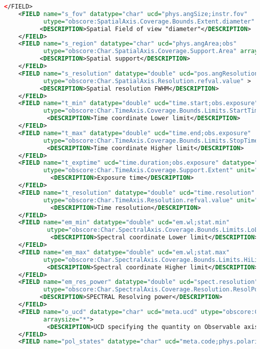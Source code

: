 \documentclass[11pt,a4paper]{ivoa}
\begin{document}
\begin{lstlisting}[basicstyle=\scriptsize,language=XML]
    </FIELD>
    <FIELD name="s_fov" datatype="char" ucd="phys.angSize;instr.fov"
           utype="obscore:SpatialAxis.Coverage.Bounds.Extent.diameter" unit="deg" >
          <DESCRIPTION>Spatial Field of view "diameter"</DESCRIPTION>
    </FIELD>
    <FIELD name="s_region" datatype="char" ucd="phys.angArea;obs"
           utype="obscore:Char.SpatialAxis.Coverage.Support.Area" arraysize="*" unit="deg" >
          <DESCRIPTION>Spatial support</DESCRIPTION>
    </FIELD>
    <FIELD name="s_resolution" datatype="double" ucd="pos.angResolution"
           utype="obscore:Char.SpatialAxis.Resolution.refval.value" >
          <DESCRIPTION>Spatial resolution FWHM</DESCRIPTION>
    </FIELD>
    <FIELD name="t_min" datatype="double" ucd="time.start;obs.exposure"
           utype="obscore:Char.TimeAxis.Coverage.Bounds.Limits.StartTime" unit="s" >
            <DESCRIPTION>Time coordinate Lower limit</DESCRIPTION>
    </FIELD>
    <FIELD name="t_max" datatype="double" ucd="time.end;obs.exposure"
           utype="obscore:Char.TimeAxis.Coverage.Bounds.Limits.StopTime" unit="s">
            <DESCRIPTION>Time coordinate Higher limit</DESCRIPTION>
    </FIELD>
    <FIELD name="t_exptime" ucd="time.duration;obs.exposure" datatype="double"
           utype="obscore:Char.TimeAxis.Coverage.Support.Extent" unit="s" >
             <DESCRIPTION>Exposure time</DESCRIPTION>
    </FIELD>
    <FIELD name="t_resolution" datatype="double" ucd="time.resolution"
           utype="obscore:Char.TimeAxis.Resolution.refval.value" unit="s" >
             <DESCRIPTION>Time resolution</DESCRIPTION>
    </FIELD>
    <FIELD name="em_min" datatype="double" ucd="em.wl;stat.min"
            utype="obscore:Char.SpectralAxis.Coverage.Bounds.Limits.LoLimit" unit="m" >
             <DESCRIPTION>Spectral coordinate Lower limit</DESCRIPTION>
    </FIELD>
    <FIELD name="em_max" datatype="double" ucd="em.wl;stat.max"
           utype="obscore:Char.SpectralAxis.Coverage.Bounds.Limits.HiLimit"  unit="m">
            <DESCRIPTION>Spectral coordinate Higher limit</DESCRIPTION>
    </FIELD>
    <FIELD name="em_res_power" datatype="double" ucd="spect.resolution"
           utype="obscore:Char.SpectralAxis.Coverage.Resolution.ResolPower.refval" >
          <DESCRIPTION>SPECTRAL Resolving power</DESCRIPTION>
    </FIELD>
    <FIELD name="o_ucd" datatype="char" ucd="meta.ucd" utype="obscore:Char.ObservableAxis.ucd"
           arraysize="*">
            <DESCRIPTION>UCD specifying the quantity on Observable axis</DESCRIPTION>
    </FIELD>
    <FIELD name="pol_states" datatype="char" ucd="meta.code;phys.polarization"

\end{lstlisting}
\end{document}
